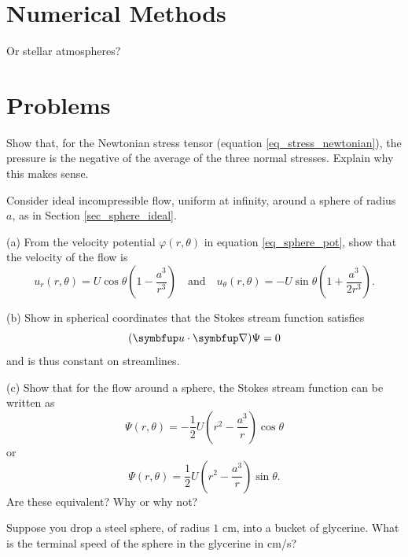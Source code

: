 %
% 

\section{Numerical Methods}

Or stellar atmospheres?



\section*{Problems}
%

\begin{problem}
\label{prob_pressure} 
Show that, for the Newtonian stress tensor (equation \ref{eq_stress_newtonian}), the pressure is the negative of the average of the three normal stresses.  Explain why this makes sense.
\end{problem}

\begin{problem}
\label{prob_sphere} 
Consider ideal incompressible flow, uniform at infinity, around a sphere of radius $a$, as in Section \ref{sec_sphere_ideal}.

(a) From the velocity potential $\varphi(r, \theta)$ in equation \ref{eq_sphere_pot}, show that the velocity of the flow is
\[
u_r (r, \theta) = U \cos \theta \left( 1 - \frac{a^3}{r^3} \right) \quad \text{and} \quad u_\theta(r, \theta) = -U \sin \theta \left( 1 + \frac{a^3}{2r^3} \right).
\]

(b) Show in spherical coordinates that the Stokes stream function satisfies
\[
(\vec{u} \cdot \grad) \Psi = 0
\]
and is thus constant on streamlines.

(c) Show that for the flow around a sphere, the Stokes stream function can be written as
\[
\Psi (r, \theta) = -\frac{1}{2} U \left( r^2 - \frac{a^3}{r} \right) \cos \theta
\]
or
\[
\Psi (r, \theta) = \frac{1}{2} U \left( r^2 - \frac{a^3}{r} \right) \sin \theta.
\]
Are these equivalent?  Why or why not?
\end{problem}



\begin{problem}
\label{prob_terminal_vel} 
Suppose you drop a steel sphere, of radius $1$ cm, into a bucket of glycerine.  What is the terminal speed of the sphere in the glycerine in cm/s?
\end{problem}




